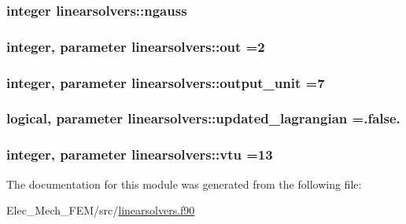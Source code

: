 \subsubsection[{ngauss}]{\setlength{\rightskip}{0pt plus 5cm}integer linearsolvers\+::ngauss}\label{classlinearsolvers_a8ced5281550d7cc415867f4ffad677cc}
\hypertarget{classlinearsolvers_a5af0b90122d00e31c2ecaac4918dc001}{}
\subsubsection[{out}]{\setlength{\rightskip}{0pt plus 5cm}integer, parameter linearsolvers\+::out =2}\label{classlinearsolvers_a5af0b90122d00e31c2ecaac4918dc001}
\hypertarget{classlinearsolvers_ac4dc5d7d05bef334ad9d56f0c80fe21d}{}
\subsubsection[{output\+\_\+unit}]{\setlength{\rightskip}{0pt plus 5cm}integer, parameter linearsolvers\+::output\+\_\+unit =7}\label{classlinearsolvers_ac4dc5d7d05bef334ad9d56f0c80fe21d}
\hypertarget{classlinearsolvers_a3beb4a2e461e3f23690b04384b5193db}{}
\subsubsection[{updated\+\_\+lagrangian}]{\setlength{\rightskip}{0pt plus 5cm}logical, parameter linearsolvers\+::updated\+\_\+lagrangian =.false.}\label{classlinearsolvers_a3beb4a2e461e3f23690b04384b5193db}
\hypertarget{classlinearsolvers_a7088a307d979587da84eeee7ccd568a0}{}
\subsubsection[{vtu}]{\setlength{\rightskip}{0pt plus 5cm}integer, parameter linearsolvers\+::vtu =13}\label{classlinearsolvers_a7088a307d979587da84eeee7ccd568a0}


The documentation for this module was generated from the following file\+:\begin{DoxyCompactItemize}
\item 
Elec\+\_\+\+Mech\+\_\+\+F\+E\+M/src/\hyperlink{linearsolvers_8f90}{linearsolvers.\+f90}\end{DoxyCompactItemize}
